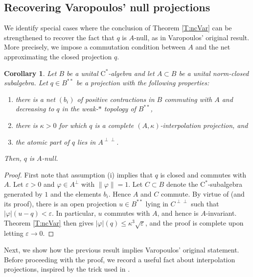 \documentclass[10pt]{amsart}
\newcommand{\rC}{\mathrm{C}}
\newcommand{\eps}{\varepsilon}
\renewcommand{\phi}{\varphi}
\newtheorem{corollary}[lemma]{Corollary}
\theoremstyle{definition}
\begin{document}
 
\subsection{Recovering Varopoulos' null projections}
We identify special cases where the conclusion of Theorem \ref{T:ncVar} can be strengthened to recover the fact that $q$ is $A$-null, as in Varopoulos' original result. More precisely, we impose a commutation condition between $A$ and the net approximating the closed projection $q$.

\begin{corollary}\label{C:ncVarcomm}
 Let $B$ be a unital $\rC^*$-algebra and let $A\subset B$ be a unital norm-closed subalgebra.  Let $q\in B^{**}$ be a projection with the following properties:
 \begin{enumerate}[{\rm(i)}]
 \item there is a net $(b_i)$ of positive contractions in $B$ commuting with $A$ and decreasing to $q$ in the weak-$*$ topology of $B^{**}$, 
 \item there is $\kappa>0$ for which $q$ is a complete $(A,\kappa)$-interpolation projection, and
 \item the atomic part of $q$ lies in $A^{\perp\perp}$.
\end{enumerate}
Then, $q$ is $A$-null.
\end{corollary}
\begin{proof}
First note that assumption (i) implies that $q$ is closed and commutes with $A$. Let $\eps>0$ and $\phi\in A^\perp$ with $\|\phi\|=1$. Let $C\subset B$ denote the $\rC^*$-subalgebra generated by $1$ and the elements $b_i$. Hence $A$ and $C$ commute. By virtue of \cite[Proposition II.3]{akemann1969} (and its proof), there is an open projection $u\in B^{**}$ lying in $C^{\perp\perp}$ such that $|\phi|(u-q)<\eps$. In particular, $u$ commutes with $A$, and hence is $A$-invariant.
Theorem \ref{T:ncVar} then gives $ |\phi|(q)\leq \kappa^3 \sqrt{\eps}$, and the proof is complete upon letting $\eps\to 0$.
\end{proof}
 
 Next, we show how the previous result implies Varopoulos' original statement.  Before proceeding with the proof, we record a useful fact about interpolation projections,  inspired by the trick used in \cite[Lemma 10.1]{DH2023}.
\end{document}

